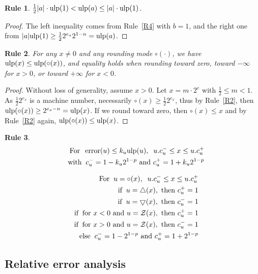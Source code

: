 \documentclass[12pt]{amsart}
\def\n{\textnormal}
\def\pinf{\bigtriangleup}
\def\minf{\bigtriangledown}
\def\ulp{{\rm ulp}}
\def\Z{{\mathcal Z}}
\DeclareMathOperator{\error}{error}
\newtheorem{Rule}{Rule}
\begin{document}
\begin{Rule} \label{R7}
$\frac{1}{2} |a| \cdot \ulp(1) < \ulp(a) \leq |a| \cdot \ulp(1)$.
\end{Rule}
\begin{proof}
The left inequality comes from Rule~\ref{R4} with $b=1$,
and the right one from $|a| \ulp(1) \geq \frac{1}{2} 2^{e_a} 2^{1-n} =\ulp(a)$.
\end{proof}

\begin{Rule} \label{R8}
For any $x \neq 0$ and any rounding mode $\circ(\cdot)$,
we have $\ulp(x) \leq \ulp(\circ(x))$, and equality holds when rounding toward
zero, toward $-\infty$ for $x>0$, or toward $+\infty$ for $x<0$.
\end{Rule}
\begin{proof}
Without loss of generality, assume $x > 0$.
Let $x = m \cdot 2^e$ with $\frac{1}{2} \leq m < 1$.
As $\frac{1}{2} 2^{e_x}$ is a machine number, necessarily $\circ(x) \geq
\frac{1}{2} 2^{e_x}$, thus by Rule~\ref{R2}, then $\ulp(\circ(x)) \geq
2^{e_x - n} = \ulp(x)$.
If we round toward zero, then $\circ(x) \leq x$ and by Rule~\ref{R2} again,
$\ulp(\circ(x)) \leq \ulp(x)$.
\end{proof}

\begin{Rule} \label{R9}
\begin{eqnarray}\nonumber
&&\n{For}\;\;  \error(u) \leq k_u \ulp(u),\;\; u.c_u^- \leq x \leq u.c_u^+\\\nonumber
&&\n{with}\;\;   c_u^{-}=1- k_u 2^{1-p} \n{ and } c_u^{+}=1+ k_u 2^{1-p}
\end{eqnarray}

\begin{eqnarray}\nonumber
&&\n{For}\;\;  u=\circ(x),\;\; u.c_u^- \leq x \leq u.c_u^+\\\nonumber
&&\n{if}\;\;  u=\pinf(x),\n{ then } c_u^+=1\\\nonumber
&&\n{if}\;\;  u=\minf(x),\n{ then } c_u^-=1\\\nonumber
&&\n{if}\;\;  \n{for $x<0$ and } u=\Z(x),\n{ then } c_u^+=1 \\\nonumber
&&\n{if}\;\;  \n{for $x>0$ and } u=\Z(x),\n{ then } c_u^-=1 \\\nonumber
&&\n{else}\;\;   c_u^{-}=1-2^{1-p} \n{ and } c_u^{+}=1+2^{1-p}
\end{eqnarray}
\end{Rule}

\subsection{Relative error analysis}
\end{document}
